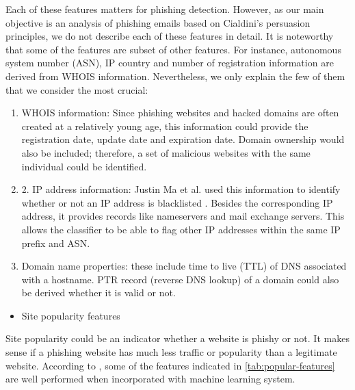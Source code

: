 Each of these features matters for phishing detection. However, as
our main objective is an analysis of phishing emails based on Cialdini's
persuasion principles, we do not describe each of these features in
detail. It is noteworthy that some of the features are subset of other
features. For instance, autonomous system number (ASN), IP country
and number of registration information are derived from WHOIS information.
Nevertheless, we only explain the few of them that we consider the
most crucial:
\begin{enumerate}
\item WHOIS information: Since phishing websites and hacked domains are
often created at a relatively young age, this information could provide
the registration date, update date and expiration date. Domain ownership
would also be included; therefore, a set of malicious websites with
the same individual could be identified. 
\item 2. IP address information: Justin Ma et al. used this information
to identify whether or not an IP address is blacklisted \citep{ma2:2009,ma:2009}.
Besides the corresponding IP address, it provides records like nameservers
and mail exchange servers. This allows the classifier to be able to
flag other IP addresses within the same IP prefix and ASN. 
\item Domain name properties: these include time to live (TTL) of DNS associated
with a hostname. PTR record (reverse DNS lookup) of a domain could
also be derived whether it is valid or not.\end{enumerate}
\begin{itemize}
\item Site popularity features
\end{itemize}
Site popularity could be an indicator whether a website is phishy
or not. It makes sense if a phishing website has much less traffic
or popularity than a legitimate website. According to \citep{xiang:2011},
some of the features indicated in \autoref{tab:popular-features}
are well performed when incorporated with machine learning system. 

